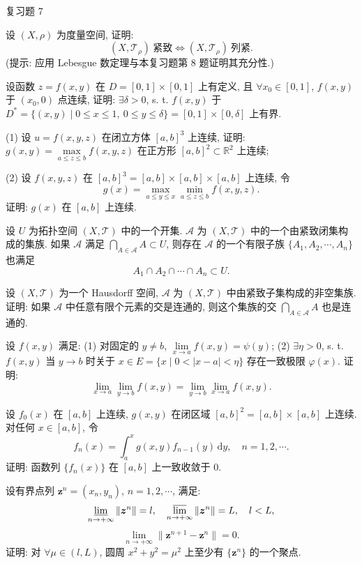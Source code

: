 \begin{exblock}{复习题 7}
  \item 设 $(X, \rho)$ 为度量空间, 证明:
  \[
    (X, \mathcal{T}_{\rho})\ \text{紧致} \iff (X, \mathcal{T}_{\rho})\ \text{列紧}.
  \]
  (提示: 应用 Lebesgue 数定理与本复习题第 8 题证明其充分性.)

  \item 设函数 $z = f(x, y)$ 在 $D = [0, 1] \times [0, 1]$ 上有定义, 且 $\forall x_{0} \in [0, 1]$, $f(x, y)$ 于 $(x_{0}, 0)$ 点连续, 证明: $\exists \delta > 0$, s. t. $f(x, y)$ 于 $D^{*} = \{(x, y) \mid 0 \leqslant x \leqslant 1,\ 0 \leqslant y \leqslant \delta\} = [0, 1] \times [0, \delta]$ 上有界.

  \item (1) 设 $u = f(x, y, z)$ 在闭立方体 $[a, b]^{3}$ 上连续, 证明: $g(x, y) = \max\limits_{a \leqslant z \leqslant b} f(x, y, z)$ 在正方形 $[a, b]^{2} \subset \mathbb{R}^{2}$ 上连续;

  (2) 设 $f(x, y, z)$ 在 $[a, b]^{3} = [a, b] \times [a, b] \times [a, b]$ 上连续, 令
  \[
    g(x) = \max_{a \leqslant y \leqslant x} \min_{a \leqslant z \leqslant b} f(x, y, z).
  \]
  证明: $g(x)$ 在 $[a, b]$ 上连续.

  \item 设 $U$ 为拓扑空间 $(X, \mathcal{T})$ 中的一个开集. $\mathcal{A}$ 为 $(X, \mathcal{T})$ 中的一个由紧致闭集构成的集族. 如果 $\mathcal{A}$ 满足 $\bigcap\limits_{A \in \mathcal{A}} A \subset U$, 则存在 $\mathcal{A}$ 的一个有限子族 $\{A_{1}, A_{2}, \cdots, A_{n}\}$ 也满足
  \[
    A_{1} \cap A_{2} \cap \cdots \cap A_{n} \subset U.
  \]

  \item 设 $(X, \mathcal{T})$ 为一个 Hausdorff 空间, $\mathcal{A}$ 为 $(X, \mathcal{T})$ 中由紧致子集构成的非空集族. 证明: 如果 $\mathcal{A}$ 中任意有限个元素的交是连通的, 则这个集族的交 $\bigcap\limits_{A \in \mathcal{A}} A$ 也是连通的.

  \item 设 $f(x, y)$ 满足: (1) 对固定的 $y \neq b$, $\lim\limits_{x \to a} f(x, y) = \psi(y)$; (2) $\exists \eta > 0$, s. t. $f(x, y)$ 当 $y \to b$ 时关于 $x \in E = \{x \mid 0 < |x - a| < \eta\}$ 存在一致极限 $\varphi(x)$. 证明:
  \[
    \lim_{x \to a} \lim_{y \to b} f(x, y) = \lim_{y \to b} \lim_{x \to a} f(x, y).
  \]

  \item 设 $f_{0}(x)$ 在 $[a, b]$ 上连续, $g(x, y)$ 在闭区域 $[a, b]^{2} = [a, b] \times [a, b]$ 上连续. 对任何 $x \in [a, b]$, 令
  \[
    f_{n}(x) = \int_{a}^{x} g(x, y)f_{n-1}(y)\,\mathrm{d}y, \quad n = 1, 2, \cdots.
  \]
  证明: 函数列 $\{f_{n}(x)\}$ 在 $[a, b]$ 上一致收敛于 $0$.

  \item 设有界点列 $\boldsymbol{z}^{n} = (x_{n}, y_{n})$, $n = 1, 2, \cdots$, 满足:
  \[
    \varliminf_{n \to +\infty} \|\boldsymbol{z}^{n}\| = l, \quad \varlimsup_{n \to +\infty} \|\boldsymbol{z}^{n}\| = L, \quad l < L,
  \]
  \[
    \lim_{n \to +\infty} \|\boldsymbol{z}^{n+1} - \boldsymbol{z}^{n}\| = 0.
  \]
  证明: 对 $\forall \mu \in (l, L)$, 圆周 $x^{2} + y^{2} = \mu^{2}$ 上至少有 $\{\boldsymbol{z}^{n}\}$ 的一个聚点.
\end{exblock}
